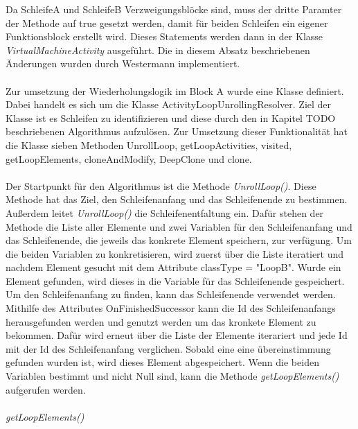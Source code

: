     Da SchleifeA und SchleifeB Verzweigungsblöcke sind, muss der dritte Paramter der Methode auf true gesetzt werden, damit für beiden Schleifen ein eigener Funktionsblock erstellt wird.
    Dieses Statements werden dann in der Klasse \textit{VirtualMachineActivity} ausgeführt.
    Die in diesem Absatz beschriebenen Änderungen wurden durch Westermann implementiert.\\
    \\
    Zur umsetzung der Wiederholungslogik im Block A wurde eine Klasse definiert.
    Dabei handelt es sich um die Klasse ActivityLoopUnrollingResolver.
    Ziel der Klasse ist es Schleifen zu identifizieren und diese durch den in Kapitel TODO beschriebenen Algorithmus aufzulösen.
    Zur Umsetzung dieser Funktionalität hat die Klasse sieben Methoden UnrollLoop, getLoopActivities, visited, getLoopElements, cloneAndModify, DeepClone und clone.\\
    \\
    Der Startpunkt für den Algorithmus ist die Methode \textit{UnrollLoop()}.
    Diese Methode hat das Ziel, den Schleifenanfang und das Schleifenende zu bestimmen. 
    Außerdem leitet \textit{UnrollLoop()} die Schleifenentfaltung ein.
    Dafür stehen der Methode die Liste aller Elemente und zwei Variablen für den Schleifenanfang und das Schleifenende, die jeweils das konkrete Element speichern, zur verfügung.
    Um die beiden Variablen zu konkretisieren, wird zuerst über die Liste iteratiert und nachdem Element gesucht mit dem Attribute classType = "LoopB".  %
    Wurde ein Element gefunden, wird dieses in die Variable für das Schleifenende gespeichert.
    Um den Schleifenanfang zu finden, kann das Schleifenende verwendet werden.
    Mithilfe des Attributes OnFinishedSuccessor kann die Id des Schleifenanfangs herausgefunden werden und genutzt werden um das kronkete Element zu bekommen.
    Dafür wird erneut über die Liste der Elemente iterariert und jede Id mit der Id des Schleifenanfang verglichen.
    Sobald eine eine übereinstimmung gefunden wurden ist, wird dieses Element abgespeichert. 
    Wenn die beiden Variablen bestimmt und nicht Null sind, kann die Methode \textit{getLoopElements()} aufgerufen werden.\\
    \\
    \textit{getLoopElements()} 

